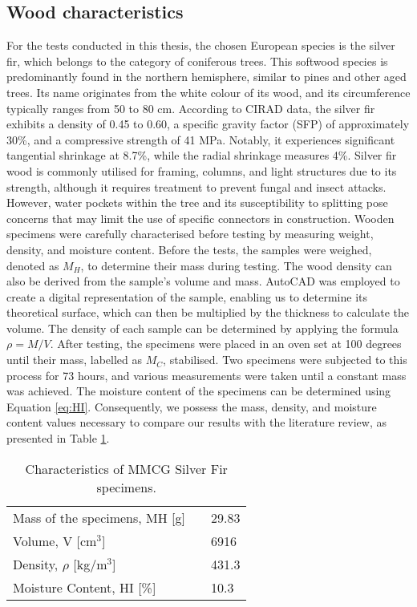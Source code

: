 \subsection{Wood characteristics}

For the tests conducted in this thesis, the chosen European species is the silver fir, which belongs to the category of coniferous trees. This softwood species is predominantly found in the northern hemisphere, similar to pines and other aged trees. Its name originates from the white colour of its wood, and its circumference typically ranges from 50 to 80 cm. According to CIRAD data, the silver fir exhibits a density of 0.45 to 0.60, a specific gravity factor (SFP) of approximately 30\%, and a compressive strength of 41 MPa. Notably, it experiences significant tangential shrinkage at 8.7\%, while the radial shrinkage measures 4\%. Silver fir wood is commonly utilised for framing, columns, and light structures due to its strength, although it requires treatment to prevent fungal and insect attacks. However, water pockets within the tree and its susceptibility to splitting pose concerns that may limit the use of specific connectors in construction.
Wooden specimens were carefully characterised before testing by measuring weight, density, and moisture content. Before the tests, the samples were weighed, denoted as $M_H$, to determine their mass during testing. The wood density can also be derived from the sample's volume and mass. AutoCAD was employed to create a digital representation of the sample, enabling us to determine its theoretical surface, which can then be multiplied by the thickness to calculate the volume. The density of each sample can be determined by applying the formula $\rho = M/V$.
After testing, the specimens were placed in an oven set at 100 degrees until their mass, labelled as $M_C$, stabilised. Two specimens were subjected to this process for 73 hours, and various measurements were taken until a constant mass was achieved. The moisture content of the specimens can be determined using Equation \ref{eq:HI}. Consequently, we possess the mass, density, and moisture content values necessary to compare our results with the literature review, as presented in Table \ref{tab:Tabmean}.

\begin{table}[h]
	\centering
	\begin{tabular}{lcl}\toprule
		Mass of the specimens, MH [g] && 29.83  \\
		Volume, V [cm$^3$] && 6916  \\
		Density, $\rho$ [kg/m$^3$] && 431.3  \\
		Moisture Content, HI [\%] && 10.3 \\\bottomrule
	\end{tabular}
	\caption{Characteristics of MMCG Silver Fir specimens.}
	\label{tab:Tabmean}
\end{table}

